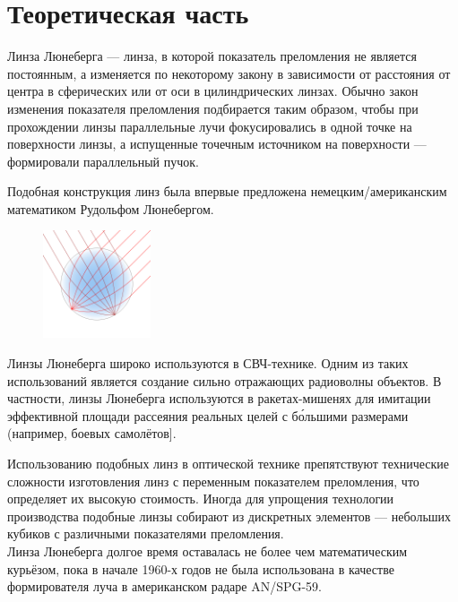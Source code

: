 \documentclass{article}
\begin{document}
\section{Теоретическая часть}

Линза Люнеберга — линза, в которой показатель преломления не является постоянным, а изменяется по некоторому закону в зависимости от расстояния от центра в сферических или от оси в цилиндрических линзах. Обычно закон изменения показателя преломления подбирается таким образом, чтобы при прохождении линзы параллельные лучи фокусировались в одной точке на поверхности линзы, а испущенные точечным источником на поверхности — формировали параллельный пучок.

Подобная конструкция линз была впервые предложена немецким/американским математиком Рудольфом Люнебергом.\\[10pt]

\begin{figure}[H]
    \centering
    \includegraphics[width=120]{image3.png}
    \caption{}
    \label{tok_per_tweet}
\end{figure}

Линзы Люнеберга широко используются в СВЧ-технике. Одним из таких использований является создание сильно отражающих радиоволны объектов. В частности, линзы Люнеберга используются в ракетах-мишенях для имитации эффективной площади рассеяния реальных целей с бо́льшими размерами (например, боевых самолётов].

Использованию подобных линз в оптической технике препятствуют технические сложности изготовления линз с переменным показателем преломления, что определяет их высокую стоимость. Иногда для упрощения технологии производства подобные линзы собирают из дискретных элементов — небольших кубиков с различными показателями преломления.\\[10pt]

Линза Люнеберга долгое время оставалась не более чем математическим курьёзом, пока в начале 1960-х годов не была использована в качестве формирователя луча в американском радаре AN/SPG-59.
\end{document}
